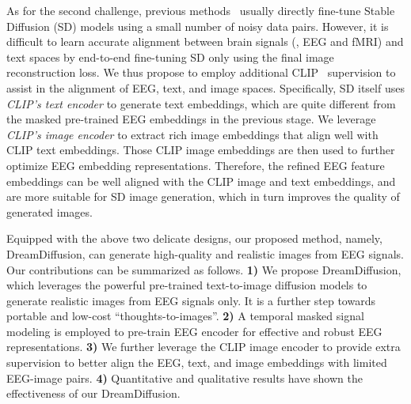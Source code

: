 \documentclass[10pt,twocolumn,letterpaper]{article}
\begin{document}
As for the second challenge, previous methods~\cite{takagi2022high, chen2022seeing} usually directly fine-tune Stable Diffusion (SD) models using a small number of noisy data pairs.
However, it is difficult to learn accurate alignment between brain signals (\eg, EEG and fMRI) and text spaces by end-to-end fine-tuning SD only using the final image reconstruction loss.
We thus propose to employ additional CLIP~\cite{radford2021learning} supervision to assist in the alignment of EEG, text, and image spaces. 
Specifically, SD itself uses \textit{CLIP's text encoder} to generate text embeddings, which are quite different from the masked pre-trained EEG embeddings in the previous stage. 
We leverage \textit{CLIP's image encoder} to extract rich image embeddings that align well with CLIP text embeddings. Those CLIP image embeddings are then used to further optimize EEG embedding representations. 
Therefore, the refined EEG feature embeddings can be well aligned with the CLIP image and text embeddings, and are more suitable for SD image generation, which in turn improves the quality of generated images. 

Equipped with the above two delicate designs, our proposed method, namely, DreamDiffusion, can generate high-quality and realistic images from EEG signals.
Our contributions can be summarized as follows.
\textbf{1)} We propose DreamDiffusion, which leverages the powerful pre-trained text-to-image diffusion models to generate realistic images from EEG signals only. It is a further step towards portable and low-cost ``thoughts-to-images''.
\textbf{2)} A temporal masked signal modeling is employed to pre-train EEG encoder for effective and robust EEG representations.
\textbf{3)} We further leverage the CLIP image encoder to provide extra supervision to better align the EEG, text, and image embeddings with limited EEG-image pairs.
\textbf{4)} Quantitative and qualitative results have shown the effectiveness of our DreamDiffusion.

\end{document}
